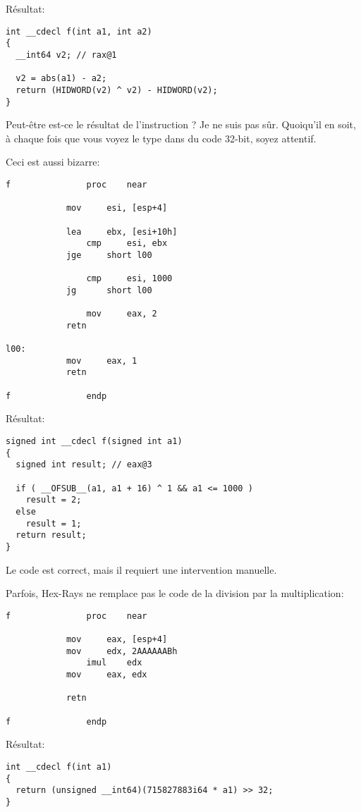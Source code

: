 Résultat:

\begin{lstlisting}
int __cdecl f(int a1, int a2)
{
  __int64 v2; // rax@1

  v2 = abs(a1) - a2;
  return (HIDWORD(v2) ^ v2) - HIDWORD(v2);
}
\end{lstlisting}

Peut-être est-ce le résultat de l'instruction ? Je ne suis pas sûr.
Quoiqu'il en soit, à chaque fois que vous voyez le type  dans du code
32-bit, soyez attentif.

Ceci est aussi bizarre:

\begin{lstlisting}
f               proc    near

	        mov     esi, [esp+4]

        	lea     ebx, [esi+10h]
                cmp     esi, ebx
	        jge     short l00

                cmp     esi, 1000
	        jg      short l00

                mov     eax, 2
	        retn

l00:
	        mov     eax, 1
        	retn

f               endp
\end{lstlisting}

Résultat:

\begin{lstlisting}
signed int __cdecl f(signed int a1)
{
  signed int result; // eax@3

  if ( __OFSUB__(a1, a1 + 16) ^ 1 && a1 <= 1000 )
    result = 2;
  else
    result = 1;
  return result;
}
\end{lstlisting}

Le code est correct, mais il requiert une intervention manuelle.

Parfois, Hex-Rays ne remplace pas le code de la division par la multiplication:

\begin{lstlisting}
f               proc    near

        	mov     eax, [esp+4]
	        mov     edx, 2AAAAAABh
                imul    edx
        	mov     eax, edx

	        retn

f               endp
\end{lstlisting}

Résultat:

\begin{lstlisting}
int __cdecl f(int a1)
{
  return (unsigned __int64)(715827883i64 * a1) >> 32;
}
\end{lstlisting}

